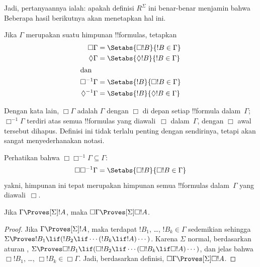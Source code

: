 \documentclass[../../../include/open-logic-section]{subfiles}
\begin{document}
\begin{explain}
Jadi, pertanyaannya ialah: apakah definisi $R^\Sigma$ ini benar-benar
menjamin bahwa  Beberapa
hasil berikutnya akan menetapkan hal ini.
\end{explain}

\begin{defn}
  Jika $\Gamma$ merupakan suatu himpunan !!{formula}s, tetapkan
  \begin{align*}
    \Box\Gamma & = \Setabs{\Box !B}{!B \in \Gamma}\\
    \Diamond\Gamma & = \Setabs{\Diamond !B}{!B \in \Gamma}\\
    \intertext{dan}
    \Box^{-1}\Gamma & = \Setabs{!B}{\Box !B \in \Gamma}\\
    \Diamond^{-1}\Gamma & = \Setabs{!B}{\Diamond !B \in \Gamma}\\
  \end{align*}
\end{defn}

Dengan kata lain, $\Box\Gamma$ adalah $\Gamma$ dengan $\Box$ di depan setiap
!!{formula} dalam~$\Gamma$; $\Box^{-1}\Gamma$ terdiri atas semua
!!{formula}s yang diawali~$\Box$ dalam~$\Gamma$, dengan $\Box$ awal tersebut
dihapus. Definisi ini tidak terlalu penting dengan sendirinya, tetapi akan
sangat menyederhanakan notasi.

Perhatikan bahwa $\Box\Box^{-1}\Gamma \subseteq \Gamma$:
\[
\Box\Box^{-1}\Gamma = \Setabs{\Box!B}{\Box!B \in \Gamma}
\]
yakni, himpunan ini tepat merupakan himpunan semua !!{formula}s dalam~$\Gamma$
yang diawali~$\Box$.

\begin{lem}
  Jika $\Gamma \Proves[\Sigma] !A$, maka $\Box\Gamma \Proves[\Sigma] \Box
  !A$.
\end{lem}

\begin{proof}
  Jika $\Gamma \Proves[\Sigma] !A$, maka terdapat $!B_1$, \dots, $!B_k
  \in \Gamma$ sedemikian sehingga $\Sigma \Proves !B_1 \lif (!B_2 \lif \cdots
  (!B_k \lif !A)\cdots)$. Karena $\Sigma$ normal, berdasarkan aturan \RK{},
  $\Sigma \Proves \Box!B_1 \lif (\Box!B_2 \lif \cdots (\Box!B_k \lif
  \Box!A)\cdots)$, dan jelas bahwa $\Box!B_1$, \dots, $\Box!B_k \in
  \Box\Gamma$. Jadi, berdasarkan definisi, $\Box\Gamma \Proves[\Sigma] \Box
  !A$.
\end{proof}
\end{document}
